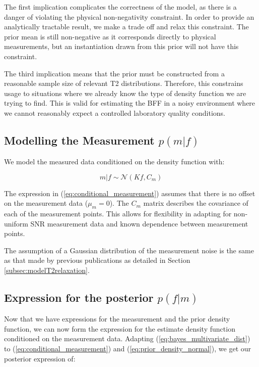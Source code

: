 The first implication complicates the correctness of the model, as there is a danger of violating the physical non-negativity constraint. In order to provide an analytically tractable result, we make a trade off and relax this constraint. The prior mean is still non-negative as it corresponds directly to physical measurements, but an instantiation drawn from this prior will not have this constraint.


The third implication means that the prior must be constructed from a reasonable sample size of relevant T2 distributions. Therefore, this constrains usage to situations where we already know the type of density function we are trying to find. This is valid for estimating the BFF in a noisy environment where we cannot reasonably expect a controlled laboratory quality conditions.

\subsection{Modelling the Measurement $p(m|f)$}

We model the measured data conditioned on the density function with:

\begin{equation}
m|f \sim \mathcal{N}(Kf, C_m)
\label{eq:conditional_measurement}
\end{equation}

The expression in (\ref{eq:conditional_measurement}) assumes that there is no offset on the measurement data ($\mu_m = 0$). The $C_m$ matrix describes the covariance of each of the measurement points. This allows for flexibility in adapting for non-uniform SNR measurement data and known dependence between measurement points.

The assumption of a Gaussian distribution of the measurement noise is the same as that made by previous publications as detailed in Section \ref{subsec:modelT2relaxation}.

\subsection{Expression for the posterior $p(f|m)$}
Now that we have expressions for the measurement and the prior density function, we can now form the expression for the estimate density function conditioned on the measurement data. Adapting (\ref{eq:bayes_multivariate_dist}) to (\ref{eq:conditional_measurement}) and (\ref{eq:prior_density_normal}), we get our posterior expression of:

